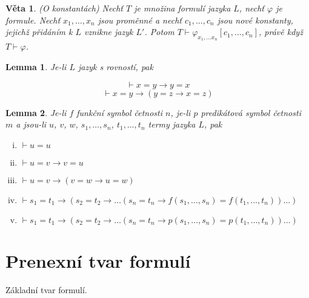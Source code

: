\documentclass[a4paper, 11pt]{report}
\newtheorem{veta}{Věta}[chapter]
\newtheorem{lemma}{Lemma}[chapter]
\begin{document}
\begin{veta}
(O konstantách) Nechť $T$ je množina formulí jazyka $L$, nechť $\varphi$ je formule. Nechť $x_1, \dots, x_n$ jsou proměnné a nechť $c_1, \dots, c_n$ jsou nové konstanty, jejichž přidáním k $L$ vznikne jazyk $L'$. Potom $T \vdash \varphi_{x_1, \dots x_n}[c_1, \dots, c_n]$, právě když $T \vdash \varphi$.
\end{veta}

\begin{lemma}
Je-li $L$ jazyk s rovností, pak

$$ \vdash x = y \to y = x $$
$$ \vdash x = y \to (y = z \to x = z) $$
\end{lemma}

\begin{lemma}
Je-li $f$ funkční symbol četnosti $n$, je-li $p$ predikátová symbol četnosti $m$ a jsou-li $u$, $v$, $w$, $s_1, \dots, s_n$, $t_1, \dots, t_n$ termy jazyka $L$, pak
\begin{enumerate}[(i)]
	\item $\vdash u = u $
	\item $\vdash u = v \to v = u $
	\item $\vdash u = v \to (v = w \to u = w) $
	\item $\vdash s_1 = t_1 \to (s_2 = t_2 \to \dots (s_n = t_n \to f(s_1, \dots, s_n) = f(t_1, \dots, t_n)) \dots ) $
	\item $\vdash s_1 = t_1 \to (s_2 = t_2 \to \dots (s_n = t_n \to p(s_1, \dots, s_n) = p(t_1, \dots, t_n)) \dots ) $
\end{enumerate}
\end{lemma}

\section{Prenexní tvar formulí}
Základní tvar formulí.
\end{document}
